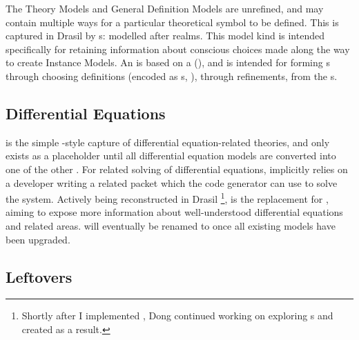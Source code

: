 \currentMultiDefnHaskell{}

The Theory Models and General Definition Models are unrefined, and may contain
multiple ways for a particular theoretical symbol to be defined. This is
captured in Drasil by \EquationalRealm{}s: modelled after realms. This model kind is intended specifically for
retaining information about conscious choices made along the way to create
Instance Models. An \EquationalRealm{} is based on a \MultiDefn{}
(), and is intended for forming \QDefinition{}s
through choosing definitions (encoded as \DefiningExpr{}s,
), through refinements, from the \MultiDefn{}s.


\subsection{Differential Equations}

\DEModel{} is the simple \RelationConcept{}-style capture of differential
equation-related theories, and only exists as a placeholder until all
differential equation models are converted into one of the other \ModelKinds{}.
For related solving of differential equations, \DEModel{} implicitly relies on a
developer writing a related \ODEInfo{} packet which
the code generator can use to solve the system. Actively being reconstructed in
Drasil \cite{Chen2022MEng} \footnote{Shortly after I implemented \ModelKind{},
Dong continued working on exploring \DEModel{}s and created \NewDEModel{} as a
result.}, \NewDEModel{} is the replacement for \DEModel{}, aiming to expose more
information about well-understood differential equations and related areas.
\NewDEModel{} will eventually be renamed to \DEModel{} once all existing
\DEModel{} models have been upgraded.


\subsection{Leftovers}


